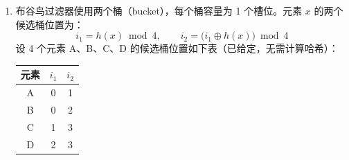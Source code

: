 \documentclass[UTF8,a4paper,11pt]{ctexart}
\newenvironment{answer}%
  {\begin{ans}\noindent{\bfseries\color{ansframe}【答案】}\hspace{0.4em}}%
  {\end{ans}}
\begin{document}
\begin{enumerate}
\begin{quote}\ttfamily\small
select L2.destination\par
from LEG as L1, LEG as L2\par
where L1.destination = L2.source and\par
\qquad L1.source = 'Pittsburgh'
\end{quote}

Estimate the number of output tuples for the above query if we have 100 distinct airports, that is $V(\text{LEG},\text{source}) = V(\text{LEG},\text{destination}) = 100$.

\noindent\textit{【中文翻译】}考虑关系 LEG(source, destination)，它记录从一个机场（source）到另一个机场（destination）的直飞航段，假设共有 $n=1000$ 个元组。考虑查询：找出距匹兹堡两跳以内的所有机场（为简化起见，保留重复元组）。若共有 100 个不同的机场，即 $V(\text{LEG},\text{source})=V(\text{LEG},\text{destination})=100$，估算上述查询的输出元组数。

\noindent\textit{Hint: First, estimate the number of tuples in the self-join.}\quad
\noindent\textit{【中文翻译】}提示：先估算自连接后的元组数。

\begin{answer}
先估计自连接：
\[
|\text{LEG}\bowtie \text{LEG}| \approx \frac{T(\text{LEG})\cdot T(\text{LEG})}{\max\bigl(V(\text{source}),V(\text{destination})\bigr)}
= \frac{1000\times 1000}{100} = 10000
\]
再考虑条件 \texttt{L1.source = 'Pittsburgh'}。假设航班均匀分布在 100 个机场上，选择率为 $1/100$：
\[
10000\times \frac{1}{100} = 100
\]
输出约 100 条元组。
\end{answer}

\item 布谷鸟过滤器使用两个桶（bucket），每个桶容量为 1 个槽位。元素 $x$ 的两个候选桶位置为：
\[
i_1 = h(x)\bmod 4, \qquad i_2 = \bigl(i_1 \oplus h(x)\bigr)\bmod 4
\]
设 4 个元素 A、B、C、D 的候选桶位置如下表（已给定，无需计算哈希）：

\begin{center}
\begin{tabular}{@{}ccc@{}}
\toprule
元素 & $i_1$ & $i_2$ \\
\midrule
A & 0 & 1 \\
B & 0 & 2 \\
C & 1 & 3 \\
D & 2 & 3 \\
\bottomrule
\end{tabular}
\end{center}


\end{enumerate}
\end{document}
